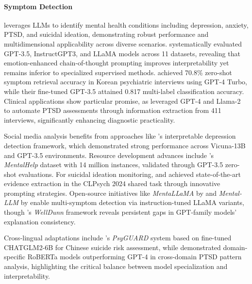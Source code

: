 \paragraph{Symptom Detection} leverages LLMs to identify mental health conditions including depression, anxiety, PTSD, and suicidal ideation, demonstrating robust performance and multidimensional applicability across diverse scenarios. \citet{18} systematically evaluated GPT-3.5, InstructGPT3, and LLaMA models across 11 datasets, revealing that emotion-enhanced chain-of-thought prompting improves interpretability yet remains inferior to specialized supervised methods. \citet{22} achieved 70.8\% zero-shot symptom retrieval accuracy in Korean psychiatric interviews using GPT-4 Turbo, while their fine-tuned GPT-3.5 attained 0.817 multi-label classification accuracy. Clinical applications show particular promise, as \citet{24} leveraged GPT-4 and Llama-2 to automate PTSD assessments through information extraction from 411 interviews, significantly enhancing diagnostic practicality. 

Social media analysis benefits from approaches like \citet{27}'s interpretable depression detection framework, which demonstrated strong performance across Vicuna-13B and GPT-3.5 environments. Resource development advances include \citet{66}'s \emph{MentalHelp} dataset with 14 million instances, validated through GPT-3.5 zero-shot evaluations. For suicidal ideation monitoring, \citet{85} and \citet{91} achieved state-of-the-art evidence extraction in the CLPsych 2024 shared task through innovative prompting strategies. Open-source initiatives like \emph{MentaLLaMA} by \citet{94} and \emph{Mental-LLM} by \citet{95} enable multi-symptom detection via instruction-tuned LLaMA variants, though \citet{96}'s \emph{WellDunn} framework reveals persistent gaps in GPT-family models' explanation consistency.

Cross-lingual adaptations include \citet{108}'s \emph{PsyGUARD} system based on fine-tuned CHATGLM2-6B for Chinese suicide risk assessment, while \citet{120} demonstrated domain-specific RoBERTa models outperforming GPT-4 in cross-domain PTSD pattern analysis, highlighting the critical balance between model specialization and interpretability.

